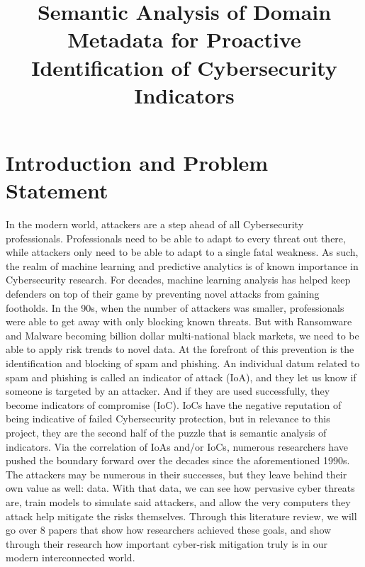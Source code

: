 \documentclass[conference]{IEEEtran}
\begin{document}
\title{Semantic Analysis of Domain Metadata for Proactive Identification of Cybersecurity Indicators}

\author{
\and
{}
}

\maketitle

\section{Introduction and Problem Statement}
In the modern world, attackers are a step ahead of all Cybersecurity professionals. 
Professionals need to be able to adapt to every threat out there, while attackers only need to be able to adapt to a single fatal weakness.
As such, the realm of machine learning and predictive analytics is of known importance in Cybersecurity research.
For decades, machine learning analysis has helped keep defenders on top of their game by preventing novel attacks from gaining footholds.
In the 90s, when the number of attackers was smaller, professionals were able to get away with only blocking known threats.
But with Ransomware and Malware becoming billion dollar multi-national black markets, we need to be able to apply risk trends to novel data.
At the forefront of this prevention is the identification and blocking of spam and phishing.
An individual datum related to spam and phishing is called an indicator of attack (IoA), and they let us know if someone is targeted by an attacker.
And if they are used successfully, they become indicators of compromise (IoC).
IoCs have the negative reputation of being indicative of failed Cybersecurity protection, but in relevance to this project, they are the second half of the puzzle that is semantic analysis of indicators.
Via the correlation of IoAs and/or IoCs, numerous researchers have pushed the boundary forward over the decades since the aforementioned 1990s.
The attackers may be numerous in their successes, but they leave behind their own value as well: data. 
With that data, we can see how pervasive cyber threats are, train models to simulate said attackers, and allow the very computers they attack help mitigate the risks themselves. 
Through this literature review, we will go over 8 papers that show how researchers achieved these goals, and show through their research how important cyber-risk mitigation truly is in our modern interconnected world.
\end{document}
